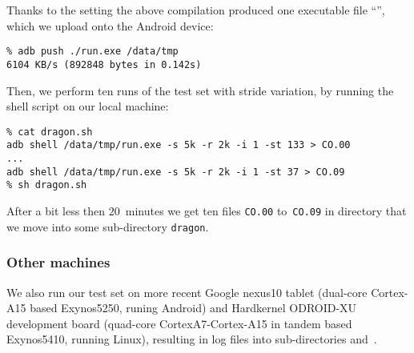 Thanks to the setting  the above compilation produced one
executable file ``'', which we upload onto the Android device:
\begin{verbatim}
% adb push ./run.exe /data/tmp
6104 KB/s (892848 bytes in 0.142s)
\end{verbatim}
Then, we perform ten runs of the test set with stride variation,
by running the shell script  on our local machine:
\begin{verbatim}
% cat dragon.sh
adb shell /data/tmp/run.exe -s 5k -r 2k -i 1 -st 133 > CO.00
...
adb shell /data/tmp/run.exe -s 5k -r 2k -i 1 -st 37 > CO.09
% sh dragon.sh
\end{verbatim}
After a bit less then $20$~minutes we get ten files
\texttt{CO.00} to~\texttt{CO.09} in directory 
that we move into some sub-directory \texttt{dragon}.

\subsubsection{Other machines}
We also run our test set on more recent
Google nexus10 tablet (dual-core Cortex-A15 based Exynos5250, runing Android)
and Hardkernel ODROID-XU development board
(quad-core CortexA7-Cortex-A15 in tandem based Exynos5410, running Linux),
resulting in log files into sub-directories  and~.

\fi
